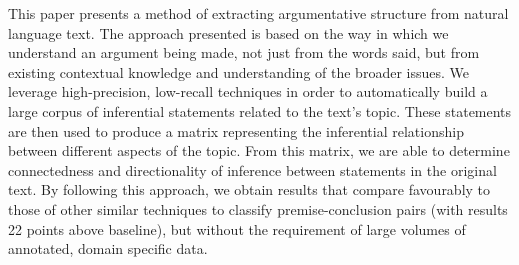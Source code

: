 This paper presents a method of extracting argumentative structure from natural language text. The approach presented is based on the way in which we understand an argument being made, not just from the words said, but from existing contextual knowledge and understanding of the broader issues. We leverage high-precision, low-recall techniques in order to automatically build a large corpus of inferential statements related to the text's topic. These statements are then used to produce a matrix representing the inferential relationship between different aspects of the topic. From this matrix, we are able to determine connectedness and directionality of inference between statements in the original text. By following this approach, we obtain results that compare favourably to those of other similar techniques to classify premise-conclusion pairs (with results 22 points above baseline), but without the requirement of large volumes of annotated, domain specific data.
